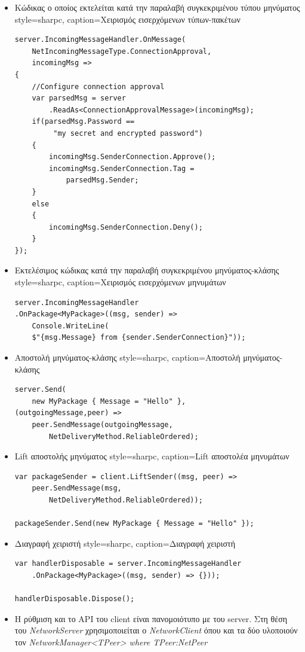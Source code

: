 \begin{itemize}
		\item Κώδικας ο οποίος εκτελείται κατά την παραλαβή συγκεκριμένου τύπου μηνύματος
	\lstset
	{
		style=sharpc, 
		caption={Χειρισμός εισερχόμενων τύπων-πακέτων}
	}
		\begin{lstlisting}
server.IncomingMessageHandler.OnMessage(
	NetIncomingMessageType.ConnectionApproval, 
	incomingMsg =>
{
	//Configure connection approval
	var parsedMsg = server
		.ReadAs<ConnectionApprovalMessage>(incomingMsg);
	if(parsedMsg.Password ==
		 "my secret and encrypted password")
	{
		incomingMsg.SenderConnection.Approve();
		incomingMsg.SenderConnection.Tag = 
			parsedMsg.Sender;
	}
	else
	{
		incomingMsg.SenderConnection.Deny();
	}
});
		\end{lstlisting}
		\item Εκτελέσιμος κώδικας κατά την παραλαβή συγκεκριμένου μηνύματος-κλάσης
	\lstset
	{
		style=sharpc, 
		caption={Χειρισμός εισερχόμενων μηνυμάτων}
	}
		\begin{lstlisting}
server.IncomingMessageHandler
.OnPackage<MyPackage>((msg, sender) => 
	Console.WriteLine(
	$"{msg.Message} from {sender.SenderConnection}"));
		\end{lstlisting}	
		\item Αποστολή μηνύματος-κλάσης
		\lstset
		{
			style=sharpc, 
			caption={Αποστολή μηνύματος-κλάσης}
		}
		\begin{lstlisting}
server.Send(
	new MyPackage { Message = "Hello" },
(outgoingMessage,peer) => 
	peer.SendMessage(outgoingMessage,
		NetDeliveryMethod.ReliableOrdered);
		\end{lstlisting}		
		\item Lift αποστολής μηνύματος
	\lstset
	{
		style=sharpc, 
		caption={Lift αποστολέα μηνυμάτων}
	}
		\begin{lstlisting}
var packageSender = client.LiftSender((msg, peer) =>
	peer.SendMessage(msg, 
		NetDeliveryMethod.ReliableOrdered));
		
packageSender.Send(new MyPackage { Message = "Hello" });	
		\end{lstlisting}	
		\item Διαγραφή χειριστή
	\lstset
	{
		style=sharpc, 
		caption={Διαγραφή χειριστή}
	}
		\begin{lstlisting}	
var handlerDisposable = server.IncomingMessageHandler
	.OnPackage<MyPackage>((msg, sender) => {}));
		
handlerDisposable.Dispose();	
		\end{lstlisting}		
		\item Η ρύθμιση και το API του client είναι πανομοιότυπο με του server. Στη θέση του \textit{NetworkServer} χρησιμοποιείται ο \textit{NetworkClient} όπου και τα δύο υλοποιούν τον \textit{NetworkManager<TPeer> where TPeer:NetPeer}		
	\end{itemize}
	
